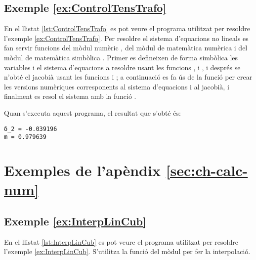 \hypertarget{exemple:ControlTensTrafo}{\subsection{Exemple \ref*{ex:ControlTensTrafo} \ControlTensTrafo}}
En el llistat \vref{lst:ControlTensTrafo} es pot veure el programa utilitzat per resoldre l'exemple \vref{ex:ControlTensTrafo}. Per resoldre el sistema d'equacions no lineals  es fan servir funcions del mòdul numèric  , del mòdul de matemàtica numèrica  i del mòdul de matemàtica simbòlica . Primer es defineixen de forma simbòlica les variables i el sistema d'equacions a resoldre usant les funcions ,  i , i després se n'obté el jacobià usant les funcions  i ; a continuació es fa ús de la funció   per crear les versions numèriques corresponents al sistema d'equacions i al jacobià, i finalment es resol el sistema amb la funció .


Quan s'executa aquest programa, el resultat que s'obté és:
\lstset{
	language=,
	numbers=none,
	frame=none
}
\begin{lstlisting}
δ_2 = -0.039196
m = 0.979639
\end{lstlisting}




\section{Exemples de l'apèndix \ref*{sec:ch-calc-num}}

\hypertarget{exemple:InterpLinCub}{\subsection{Exemple \ref*{ex:InterpLinCub} \InterpLinCub}}
En el llistat \vref{lst:InterpLinCub} es pot veure el programa utilitzat per resoldre l'exemple \vref{ex:InterpLinCub}. S'utilitza la funció  del mòdul  per fer la interpolació.


